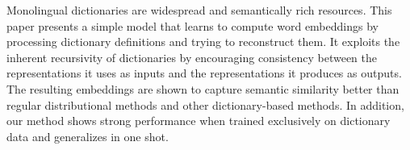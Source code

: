 Monolingual dictionaries are widespread and semantically rich resources. This paper presents a simple model that learns to compute word embeddings by processing dictionary definitions and trying to reconstruct them. It exploits the inherent recursivity of dictionaries by encouraging consistency between the representations it uses as inputs and the representations it produces as outputs. The resulting embeddings are shown to capture semantic similarity better than regular distributional methods and other dictionary-based methods. In addition, our method shows strong performance when trained exclusively on dictionary data and generalizes in one shot.
